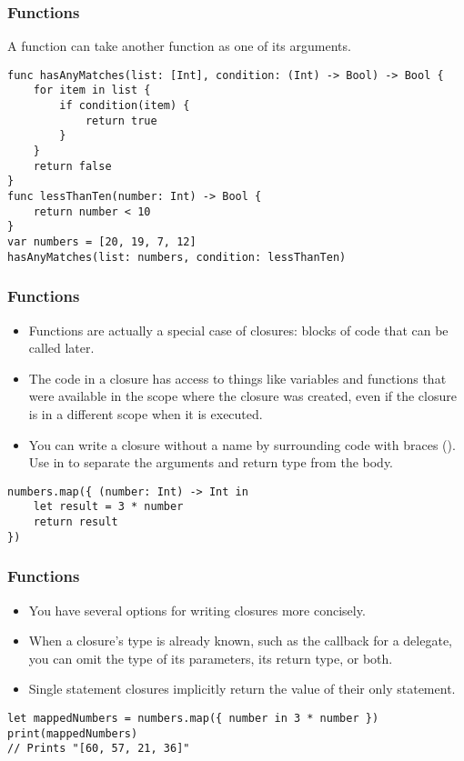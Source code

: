 \begin{frame}[fragile] \frametitle{Functions}
A function can take another function as one of its arguments.

\begin{lstlisting}
func hasAnyMatches(list: [Int], condition: (Int) -> Bool) -> Bool {
    for item in list {
        if condition(item) {
            return true
        }
    }
    return false
}
func lessThanTen(number: Int) -> Bool {
    return number < 10
}
var numbers = [20, 19, 7, 12]
hasAnyMatches(list: numbers, condition: lessThanTen)
\end{lstlisting}

\end{frame}


\begin{frame}[fragile] \frametitle{Functions}
\begin{itemize}
\item Functions are actually a special case of closures: blocks of code that can be called later. 
\item The code in a closure has access to things like variables and functions that were available in the scope where the closure was created, even if the closure is in a different scope when it is executed.
\item You can write a closure without a name by surrounding code with braces ({}). Use in to separate the arguments and return type from the body.
\end{itemize}

\begin{lstlisting}
numbers.map({ (number: Int) -> Int in
    let result = 3 * number
    return result
})
\end{lstlisting}

\end{frame}


\begin{frame}[fragile] \frametitle{Functions}
\begin{itemize}
\item You have several options for writing closures more concisely. 
\item When a closure’s type is already known, such as the callback for a delegate, you can omit the type of its parameters, its return type, or both. 
\item Single statement closures implicitly return the value of their only statement.
\end{itemize}

\begin{lstlisting}
let mappedNumbers = numbers.map({ number in 3 * number })
print(mappedNumbers)
// Prints "[60, 57, 21, 36]"
\end{lstlisting}

\end{frame}

